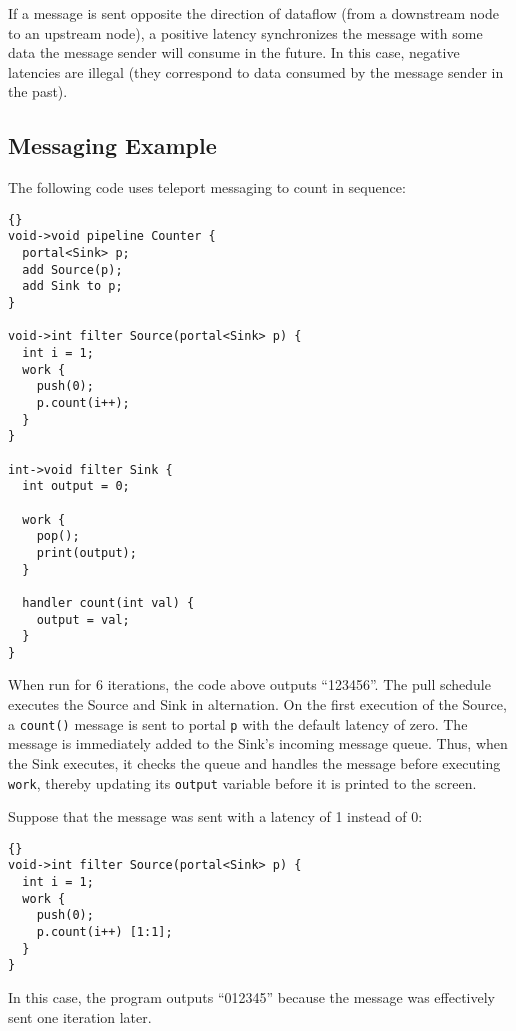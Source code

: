 \documentclass[11pt]{article}
\begin{document}
If a message is sent opposite the direction of dataflow (from a
downstream node to an upstream node), a positive latency synchronizes
the message with some data the message sender will consume in the
future.  In this case, negative latencies are illegal (they correspond
to data consumed by the message sender in the past).

\subsection{Messaging Example}
\label{sec:messaging-example}

The following code uses teleport messaging to count in sequence:

\begin{lstlisting}{}
void->void pipeline Counter {
  portal<Sink> p;
  add Source(p);
  add Sink to p;
}

void->int filter Source(portal<Sink> p) {
  int i = 1;
  work {
    push(0);
    p.count(i++);
  }
}

int->void filter Sink {
  int output = 0;

  work {
    pop();
    print(output);
  }

  handler count(int val) {
    output = val;
  }
}
\end{lstlisting}{}

When run for 6 iterations, the code above outputs ``123456''.  The
pull schedule executes the Source and Sink in alternation.  On the
first execution of the Source, a \lstinline|count()| message is sent
to portal {\tt p} with the default latency of zero.  The message is
immediately added to the Sink's incoming message queue.  Thus, when
the Sink executes, it checks the queue and handles the message before
executing {\tt work}, thereby updating its \lstinline|output| variable
before it is printed to the screen.

Suppose that the message was sent with a latency of 1 instead of 0:

\begin{lstlisting}{}
void->int filter Source(portal<Sink> p) {
  int i = 1;
  work {
    push(0);
    p.count(i++) [1:1];
  }
}
\end{lstlisting}{}

In this case, the program outputs ``012345'' because the message was
effectively sent one iteration later.

\end{document}
